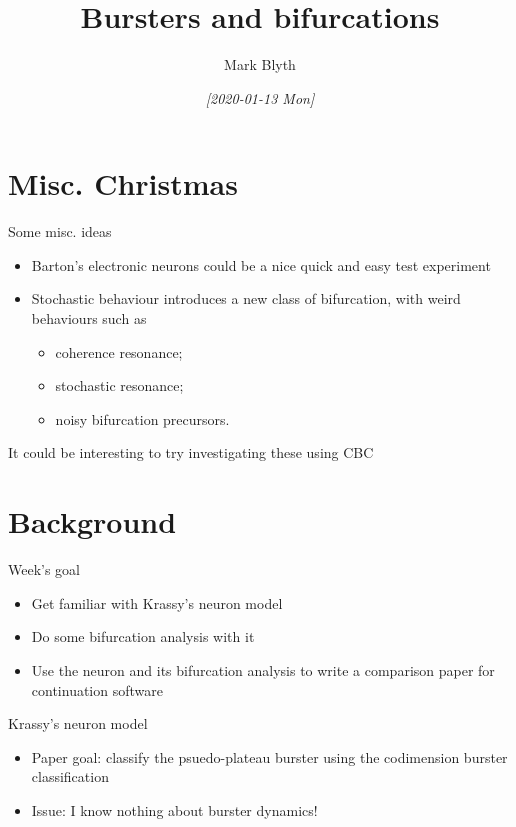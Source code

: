 \documentclass{beamer}
\author{Mark Blyth}
\date{\textit{[2020-01-13 Mon]}}
\title{Bursters and bifurcations}
\begin{document}
\maketitle

\section{Misc. Christmas}
\label{sec:org7d6bc7b}
\begin{frame}[label={sec:org0a660ec}]{Some misc. ideas}
\begin{itemize}
\item Barton's electronic neurons could be a nice quick and easy test experiment
\item Stochastic behaviour introduces a new class of bifurcation, with weird behaviours such as
\begin{itemize}
\item coherence resonance;
\item stochastic resonance;
\item noisy bifurcation precursors.
\end{itemize}
\end{itemize}
It could be interesting to try investigating these using CBC
\end{frame}


\section{Background}
\label{sec:org64ad144}
\begin{frame}[label={sec:org1ac15c3}]{Week's goal}
\begin{itemize}
\item Get familiar with Krassy's neuron model
\item Do some bifurcation analysis with it
\item Use the neuron and its bifurcation analysis to write a comparison paper for continuation software
\end{itemize}
\end{frame}

\begin{frame}[label={sec:org374ad8a}]{Krassy's neuron model}
\begin{itemize}
\item Paper goal: classify the psuedo-plateau burster using the codimension burster classification
\item Issue: I know nothing about burster dynamics!
\end{itemize}
\end{frame}
\end{document}

